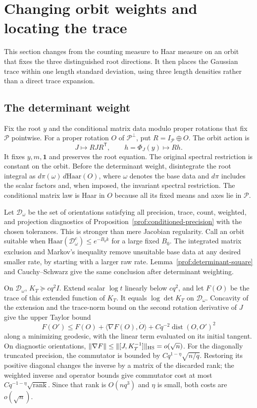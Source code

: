 \section{Changing orbit weights and locating the trace}\label{prof:orbits}

This section changes from the counting measure to Haar measure on an
orbit that fixes the three distinguished root directions. It then places
the Gaussian trace within one length standard deviation, using three
length densities rather than a direct trace expansion.

\subsection{The determinant weight}

Fix the root $y$ and the conditional matrix data modulo proper rotations
that fix $\mathcal P$ pointwise. For a proper rotation $O$ of
$\mathcal P^\perp$, put $R=I_{\mathcal P}\oplus O$. The orbit action is
\[
 J\longmapsto RJR^{\mathsf T},\qquad
 h=\Phi_J(y)\longmapsto Rh.
\]
It fixes $y,m,\mathbf1$ and preserves the root equation. The original
spectral restriction is constant on the orbit. Before the determinant
weight, disintegrate the root integral as $d\pi(\omega)\,d\mathrm{Haar}(O)$,
where $\omega$ denotes the base data and $d\pi$ includes the scalar
factors and, when imposed, the invariant spectral restriction.
The conditional matrix law is Haar in $O$ because all its fixed means
and axes lie in $\mathcal P$.

Let $\mathcal D_\omega$ be the set of orientations satisfying all
precision, trace, count, weighted, and projection diagnostics of
Proposition~\ref{prof:conditioned-precision} with the chosen tolerances.
This is stronger than mere Jacobian regularity. Call an orbit suitable
when $\mathrm{Haar}(\mathcal D_\omega^c)\le e^{-B_0k}$ for a large
fixed $B_0$. The integrated matrix exclusion and Markov's inequality
remove unsuitable base data at any desired smaller rate, by starting
with a larger raw rate. Lemma~\ref{prof:determinant-square} and
Cauchy--Schwarz give the same conclusion after determinant weighting.

On $\mathcal D_\omega$, $K_T\succeq cq^2I$. Extend scalar $\log t$
linearly below $cq^2$, and let $F(O)$ be the trace of this extended
function of $K_T$. It equals $\log\det K_T$ on $\mathcal D_\omega$.
Concavity of the extension and the trace-norm bound on the second
rotation derivative of $J$ give the upper Taylor bound
\[
 F(O')\le F(O)+\langle\nabla F(O),\dot O\rangle
                    +Cq^{-2}\operatorname{dist}(O,O')^2
\]
along a minimizing geodesic, with the linear term evaluated on its
initial tangent. On diagnostic orientations,
$\|\nabla F\|\le\|[J,K_T^{-1}]\|_{\rm HS}=o(\sqrt n)$.
For the diagonally truncated precision, the commutator is bounded by
$Cq^{1-\eta}\sqrt{n/q}$. Restoring its positive diagonal changes the
inverse by a matrix of the discarded rank; the weighted inverse and
operator bounds give commutator cost at most
$Cq^{-1-\eta}\sqrt{\operatorname{rank}}$. Since that rank is
$O(nq^3)$ and $\eta$ is small, both costs are $o(\sqrt n)$.


